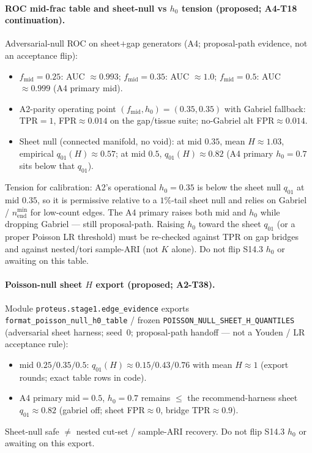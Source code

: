 \documentclass[11pt]{article}
\begin{document}
\paragraph{ROC mid-frac table and sheet-null vs $h_0$ tension (proposed;
A4-T18 continuation).}
Adversarial-null ROC on sheet$+$gap generators (A4; proposal-path evidence,
not an acceptance flip):
\begin{itemize}[leftmargin=1.5em]
  \item $f_{\mathrm{mid}}{=}0.25$: AUC $\approx 0.993$;
  $f_{\mathrm{mid}}{=}0.35$: AUC $\approx 1.0$;
  $f_{\mathrm{mid}}{=}0.5$: AUC $\approx 0.999$ (A4 primary mid).
  \item A2-parity operating point $(f_{\mathrm{mid}},h_0){=}(0.35,0.35)$ with
  Gabriel fallback: TPR${=}1$, FPR$\approx 0.014$ on the gap/tissue suite;
  no-Gabriel alt FPR$\approx 0.014$.
  \item Sheet null (connected manifold, no void): at mid $0.35$, mean
  $H\approx 1.03$, empirical $q_{01}(H)\approx 0.57$; at mid $0.5$,
  $q_{01}(H)\approx 0.82$ (A4 primary $h_0{=}0.7$ sits below that $q_{01}$).
\end{itemize}
Tension for calibration: A2's operational $h_0{=}0.35$ is below the sheet
null $q_{01}$ at mid $0.35$, so it is permissive relative to a $1\%$-tail
sheet null and relies on Gabriel / $n_{\mathrm{end}}^{\min}$ for low-count
edges. The A4 primary raises both mid and $h_0$ while dropping Gabriel ---
still proposal-path. Raising $h_0$ toward the sheet $q_{01}$ (or a proper
Poisson LR threshold) must be re-checked against TPR on gap bridges and
against nested/tori sample-ARI (not $K$ alone). Do not flip S14.3 $h_0$ or
awaiting on this table.

\paragraph{Poisson-null sheet $H$ export (proposed; A2-T38).}
Module \texttt{proteus.stage1.edge\_evidence} exports
\texttt{format\_poisson\_null\_h0\_table} / frozen
\texttt{POISSON\_NULL\_SHEET\_H\_QUANTILES} (adversarial sheet harness;
seed~$0$; proposal-path handoff --- not a Youden / LR acceptance rule):
\begin{itemize}[leftmargin=1.5em]
  \item mid $0.25/0.35/0.5$: $q_{01}(H)\approx 0.15/0.43/0.76$ with
  mean $H\approx 1$ (export rounds; exact table rows in code).
  \item A4 primary mid${=}0.5$, $h_0{=}0.7$ remains $\le$ the recommend-harness
  sheet $q_{01}\approx 0.82$ (gabriel off; sheet FPR$\approx 0$, bridge
  TPR$\approx 0.9$).
\end{itemize}
Sheet-null safe $\neq$ nested cut-set / sample-ARI recovery. Do not flip
S14.3 $h_0$ or awaiting on this export.
\end{document}
